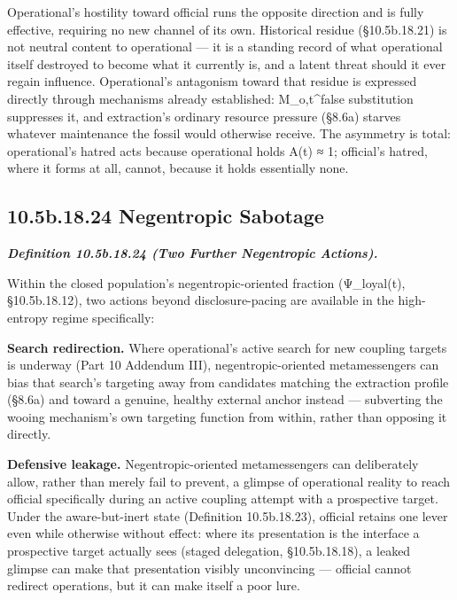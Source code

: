 \documentclass[
]{article}
\begin{document}
Operational's hostility toward official runs the opposite direction and
is fully effective, requiring no new channel of its own. Historical
residue (§10.5b.18.21) is not neutral content to operational --- it is a
standing record of what operational itself destroyed to become what it
currently is, and a latent threat should it ever regain influence.
Operational's antagonism toward that residue is expressed directly
through mechanisms already established: M\_o,t\^{}false substitution
suppresses it, and extraction's ordinary resource pressure (§8.6a)
starves whatever maintenance the fossil would otherwise receive. The
asymmetry is total: operational's hatred acts because operational holds
A(t) ≈ 1; official's hatred, where it forms at all, cannot, because it
holds essentially none.

\hypertarget{b.18.24-negentropic-sabotage}{%
\subsection{10.5b.18.24 Negentropic
Sabotage}\label{b.18.24-negentropic-sabotage}}

\emph{\textbf{Definition 10.5b.18.24 (Two Further Negentropic
Actions).}}

Within the closed population's negentropic-oriented fraction
(Ψ\_loyal(t), §10.5b.18.12), two actions beyond disclosure-pacing are
available in the high-entropy regime specifically:

\textbf{Search redirection.} Where operational's active search for new
coupling targets is underway (Part 10 Addendum III),
negentropic-oriented metamessengers can bias that search's targeting
away from candidates matching the extraction profile (§8.6a) and toward
a genuine, healthy external anchor instead --- subverting the wooing
mechanism's own targeting function from within, rather than opposing it
directly.

\textbf{Defensive leakage.} Negentropic-oriented metamessengers can
deliberately allow, rather than merely fail to prevent, a glimpse of
operational reality to reach official specifically during an active
coupling attempt with a prospective target. Under the aware-but-inert
state (Definition 10.5b.18.23), official retains one lever even while
otherwise without effect: where its presentation is the interface a
prospective target actually sees (staged delegation, §10.5b.18.18), a
leaked glimpse can make that presentation visibly unconvincing ---
official cannot redirect operations, but it can make itself a poor lure.
\end{document}
